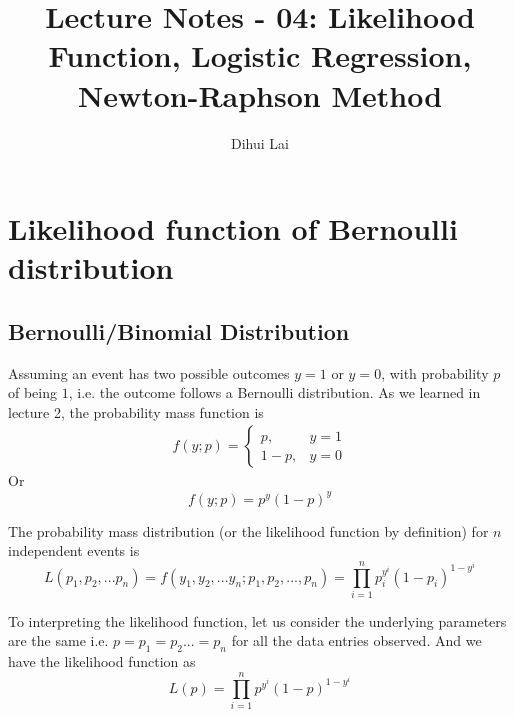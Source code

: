\documentclass[12pt, oneside]{article}
\title{Lecture Notes - 04: Likelihood Function, Logistic Regression, Newton-Raphson Method}
\author{Dihui Lai}
\begin{document}
\maketitle
\tableofcontents

\vspace{.25in}
\section{Likelihood function of Bernoulli distribution}
\subsection{ Bernoulli/Binomial Distribution}
Assuming an event has two possible outcomes $y=1$ or $y=0$, with probability $p$ of being $1$, i.e. the outcome follows a Bernoulli distribution. As we learned in lecture 2, the probability mass function is 
\begin{align*}
f(y; p)=
\begin{cases}
p, &y=1\\
1-p,  &y=0
\end{cases}
\end{align*}
Or 
$$f(y;p)=p^y(1-p)^y$$

The probability mass distribution (or the likelihood function by definition) for $n$ independent events is
$$L(p_1, p_2,...p_n)=f(y_1, y_2, ...y_n; p_1, p_2, ..., p_n)=\prod_{i=1}^{n}p_{i}^{y^i}(1-p_{i})^{1-y^{i}}$$

To interpreting the likelihood function, let us consider the underlying parameters are the same i.e. $p=p_1=p_2...=p_n$ for all the data entries observed. And we have the likelihood function as
$$L(p)={\prod_{i=1}^{n}p^{y^i}(1-p)^{1-y^{i}}}$$
\end{document}
